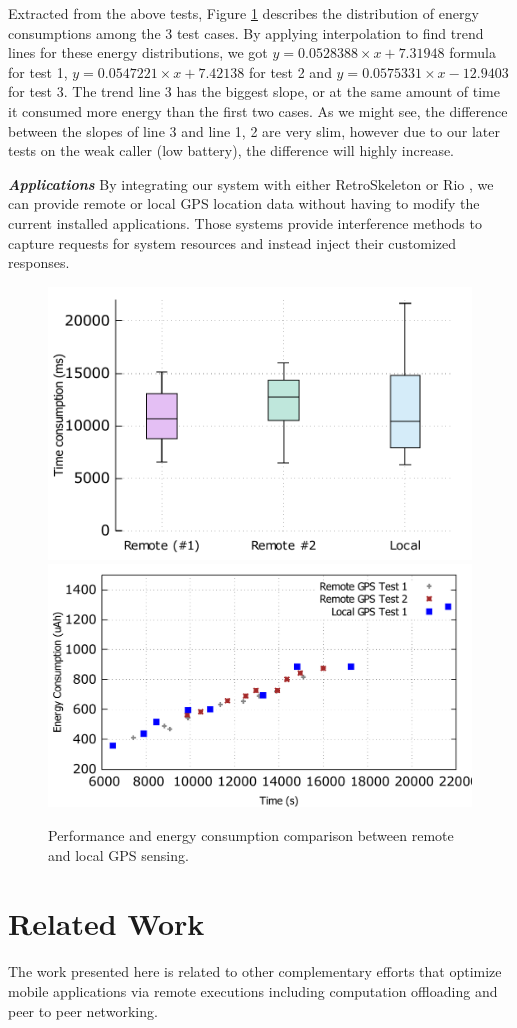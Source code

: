 \documentclass{sig-alternate}[10pt]
\begin{document}
Extracted from the above tests, Figure \ref{fig:gps_perf} describes the distribution of energy consumptions among the 3 test cases. By applying interpolation to find trend lines for these energy distributions, we got $y = 0.0528388 \times x + 7.31948$ formula for test 1, $y = 0.0547221 \times x + 7.42138$ for test 2 and $y = 0.0575331 \times x - 12.9403$ for test 3. The trend line 3 has the biggest slope, or at the same amount of time it consumed more energy than the first two cases. As we might see, the difference between the slopes of line 3 and line 1, 2 are very slim, however due to our later tests on the weak caller (low battery), the difference will highly increase. 

\textbf{\emph{Applications}}
By integrating our system with either RetroSkeleton \cite{retro-skel} or Rio \cite{rio}, we can provide remote or local GPS location data without having to modify the current installed applications. Those systems provide interference methods to capture requests for system resources and instead inject their customized responses. 

\begin{figure}
	\centering
		\includegraphics[width=.42\textwidth]{data/gps_perf.pdf}
		\includegraphics[width=.47\textwidth]{data/gps_energy_full.pdf}
	\caption{Performance and energy consumption comparison between remote and local GPS sensing.}
	\label{fig:gps_perf}
\end{figure}

\section{Related Work}
\label{sec:related}
The work presented here is related to other complementary efforts that optimize mobile applications via remote executions including computation offloading and peer to peer networking.
\end{document}
